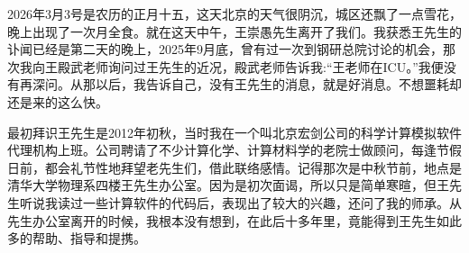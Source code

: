 \maketitle
2026年3月3号是农历的正月十五，这天北京的天气很阴沉，城区还飘了一点雪花，晚上出现了一次月全食。就在这天中午，王崇愚先生离开了我们。我获悉王先生的讣闻已经是第二天的晚上，2025年9月底，曾有过一次到钢研总院讨论的机会，那次我向王殿武老师询问过王先生的近况，殿武老师告诉我:``王老师在\textrm{ICU}。''我便没有再深问。从那以后，我告诉自己，没有王先生的消息，就是好消息。不想噩耗却还是来的这么快。%

最初拜识王先生是2012年初秋，当时我在一个叫北京宏剑公司的科学计算模拟软件代理机构上班。公司聘请了不少计算化学、计算材料学的老院士做顾问，每逢节假日前，都会礼节性地拜望老先生们，借此联络感情。记得那次是中秋节前，地点是清华大学物理系四楼王先生办公室。因为是初次面谒，所以只是简单寒暄，但王先生听说我读过一些计算软件的代码后，表现出了较大的兴趣，还问了我的师承。从先生办公室离开的时候，我根本没有想到，在此后十多年里，竟能得到王先生如此多的帮助、指导和提携。%

